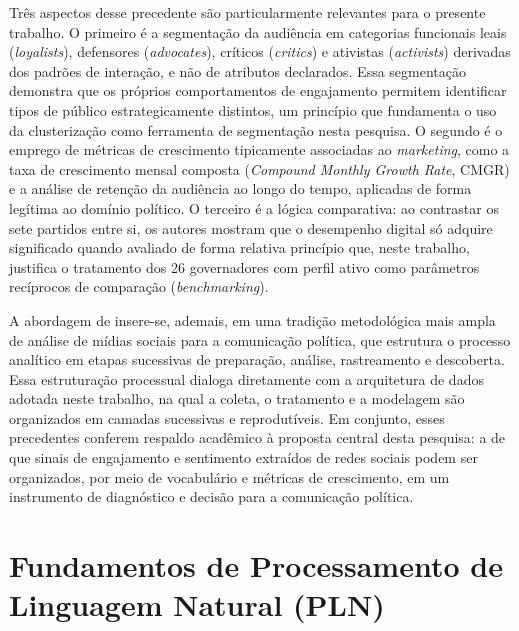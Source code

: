 Três aspectos desse precedente são particularmente relevantes para o presente trabalho. O primeiro é a segmentação da audiência em categorias funcionais \textemdash{} leais (\emph{loyalists}), defensores (\emph{advocates}), críticos (\emph{critics}) e ativistas (\emph{activists}) \textemdash{} derivadas dos padrões de interação, e não de atributos declarados. Essa segmentação demonstra que os próprios comportamentos de engajamento permitem identificar tipos de público estrategicamente distintos, um princípio que fundamenta o uso da clusterização como ferramenta de segmentação nesta pesquisa. O segundo é o emprego de métricas de crescimento tipicamente associadas ao \emph{marketing}, como a taxa de crescimento mensal composta (\emph{Compound Monthly Growth Rate}, CMGR) e a análise de retenção da audiência ao longo do tempo, aplicadas de forma legítima ao domínio político. O terceiro é a lógica comparativa: ao contrastar os sete partidos entre si, os autores mostram que o desempenho digital só adquire significado quando avaliado de forma relativa \textemdash{} princípio que, neste trabalho, justifica o tratamento dos 26 governadores com perfil ativo como parâmetros recíprocos de comparação (\emph{benchmarking}).

A abordagem de  insere-se, ademais, em uma tradição metodológica mais ampla de análise de mídias sociais para a comunicação política, que estrutura o processo analítico em etapas sucessivas de preparação, análise, rastreamento e descoberta. Essa estruturação processual dialoga diretamente com a arquitetura de dados adotada neste trabalho, na qual a coleta, o tratamento e a modelagem são organizados em camadas sucessivas e reprodutíveis. Em conjunto, esses precedentes conferem respaldo acadêmico à proposta central desta pesquisa: a de que sinais de engajamento e sentimento extraídos de redes sociais podem ser organizados, por meio de vocabulário e métricas de crescimento, em um instrumento de diagnóstico e decisão para a comunicação política.

\section{Fundamentos de Processamento de Linguagem Natural (PLN)}

